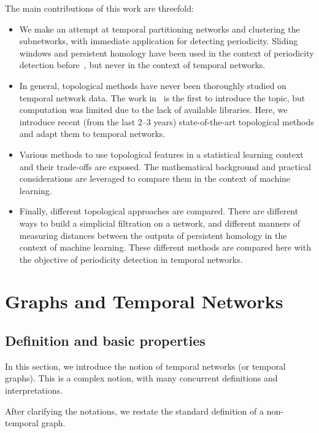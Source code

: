\documentclass[a4paper,11pt,openany,extrafontsizes]{memoir}
\begin{document}
The main contributions of this work are threefold:
\begin{itemize}
\item We make an attempt at temporal partitioning networks and
  clustering the subnetworks, with immediate application for detecting
  periodicity. Sliding windows and persistent homology have been used
  in the context of periodicity detection
  before~\cite{perea_sw1pers:_2015, perea_sliding_2017}, but never in
  the context of temporal networks.
\item In general, topological methods have never been thoroughly
  studied on temporal network data. The work
  in~\cite{price-wright_topological_2015} is the first to introduce
  the topic, but computation was limited due to the lack of available
  libraries. Here, we introduce recent (from the last 2--3 years)
  state-of-the-art topological methods and adapt them to temporal
  networks.
\item Various methods to use topological features in a statistical
  learning context and their trade-offs are exposed. The mathematical
  background and practical considerations are leveraged to compare
  them in the context of machine learning.
\item Finally, different topological approaches are compared. There
  are different ways to build a simplicial filtration on a network,
  and different manners of measuring distances between the outputs of
  persistent homology in the context of machine learning. These
  different methods are compared here with the objective of
  periodicity detection in temporal networks.
\end{itemize}


\chapter{Graphs and Temporal Networks}%
\label{cha:temporal-networks}

\section{Definition and basic properties}%
\label{sec:defin-basic-prop}

In this section, we introduce the notion of temporal networks (or
temporal graphs). This is a complex notion, with many concurrent
definitions and interpretations.

After clarifying the notations, we restate the standard definition of
a non-temporal graph.
\end{document}

